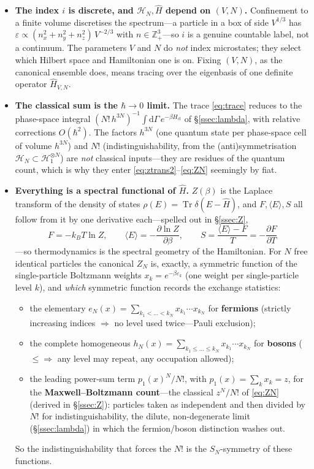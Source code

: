 \documentclass[11pt,a4paper]{article}
\theoremstyle{definition}
\newcommand{\dd}{\mathrm{d}}
\begin{document}
\begin{itemize}
\item \textbf{The index $i$ is discrete, and $\mathcal H_N,\hat H$ depend on
$(V,N)$.} Confinement to a finite volume discretises the spectrum---a particle
in a box of side $V^{1/3}$ has $\varepsilon\propto(n_x^2+n_y^2+n_z^2)\,V^{-2/3}$
with $n\in\mathbb Z_+^3$---so $i$ is a genuine countable label, not a continuum.
The parameters $V$ and $N$ do \emph{not} index microstates; they select which
Hilbert space and Hamiltonian one is on. Fixing $(V,N)$, as the canonical
ensemble does, means tracing over the eigenbasis of one definite operator
$\hat H_{V,N}$.
\item \textbf{The classical sum is the $\hbar\to0$ limit.} The trace
\eqref{eq:trace} reduces to the phase-space integral
$(N!\,h^{3N})^{-1}\!\int\dd\Gamma\,e^{-\beta H_{\mathrm{cl}}}$ of
\S\ref{ssec:lambda}, with relative corrections $O(\hbar^2)$. The factors
$h^{3N}$ (one quantum state per phase-space cell of volume $h^{3N}$) and $N!$
(indistinguishability, from the (anti)symmetrisation
$\mathcal H_N\subset\mathcal H_1^{\otimes N}$) are \emph{not} classical
inputs---they are residues of the quantum count, which is why they enter
\eqref{eq:ztrans2}--\eqref{eq:ZN} seemingly by fiat.
\item \textbf{Everything is a spectral functional of $\hat H$.} $Z(\beta)$ is
the Laplace transform of the density of states
$\rho(E)=\operatorname{Tr}\delta(E-\hat H)$, and $F,\langle E\rangle,S$ all
follow from it by one derivative each---spelled out in \S\ref{ssec:Z},
\[
F=-k_BT\ln Z,\qquad
\langle E\rangle=-\frac{\partial\ln Z}{\partial\beta},\qquad
S=\frac{\langle E\rangle-F}{T}=-\frac{\partial F}{\partial T}
\]
---so thermodynamics is the spectral geometry of the Hamiltonian. For
$N$ free identical particles the canonical $Z_N$ is, exactly, a symmetric
function of the single-particle Boltzmann weights $x_k=e^{-\beta\varepsilon_k}$
(one weight per single-particle level $k$), and \emph{which} symmetric function
records the exchange statistics:
\begin{itemize}
\item the elementary $e_N(x)=\sum_{k_1<\dots<k_N}x_{k_1}\cdots x_{k_N}$ for
\textbf{fermions} (strictly increasing indices $\Rightarrow$ no level used
twice---Pauli exclusion);
\item the complete homogeneous
$h_N(x)=\sum_{k_1\le\dots\le k_N}x_{k_1}\cdots x_{k_N}$ for \textbf{bosons}
($\le\Rightarrow$ any level may repeat, any occupation allowed);
\item the leading power-sum term $p_1(x)^N/N!$, with $p_1(x)=\sum_k x_k=z$, for
the \textbf{Maxwell--Boltzmann count}---the classical $z^N/N!$ of
\eqref{eq:ZN} (derived in \S\ref{ssec:Z}): particles taken as independent and
then divided by $N!$ for indistinguishability, the dilute, non-degenerate limit
(\S\ref{ssec:lambda}) in which the fermion/boson distinction washes out.
\end{itemize}
So the indistinguishability that forces the $N!$ is the $S_N$-symmetry of these
functions.
\end{itemize}
\end{document}
